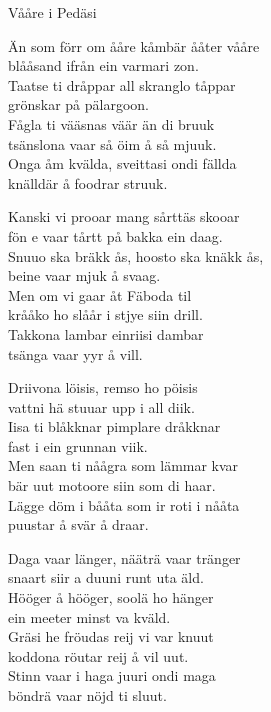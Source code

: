 \begin{song}{Vååre i Pedäsi}
	
	
	
	
	Än som förr om ååre kåmbär ååter vååre\\
	blååsand ifrån ein varmari zon.\\
	Taatse ti dråppar all skranglo tåppar\\
	grönskar på pälargoon.\\
	Fågla ti vääsnas väär än di bruuk\\
	tsänslona vaar så öim å så mjuuk.\\
	Onga åm kvälda, sveittasi ondi fällda\\
	knälldär å foodrar struuk.

	Kanski vi prooar mang sårttäs skooar\\
	fön e vaar tårtt på bakka ein daag.\\
	Snuuo ska bräkk ås, hoosto ska knäkk ås,\\
	beine vaar mjuk å svaag.\\
	Men om vi gaar åt Fäboda til\\
	krååko ho slåår i stjye siin drill.\\
	Takkona lambar einriisi dambar\\
	tsänga vaar yyr å vill.

	Driivona löisis, remso ho pöisis\\
	vattni hä stuuar upp i all diik.\\
	Iisa ti blåkknar pimplare dråkknar\\
	fast i ein grunnan viik.\\
	Men saan ti nåågra som lämmar kvar\\
	bär uut motoore siin som di haar.\\
	Lägge döm i bååta som ir roti i nååta\\
	puustar å svär å draar.

	Daga vaar länger, nääträ vaar tränger\\
	snaart siir a duuni runt uta äld.\\
	Hööger å hööger, soolä ho hänger\\
	ein meeter minst va kväld.\\
	Gräsi he fröudas reij vi var knuut\\
	koddona röutar reij å vil uut.\\
	Stinn vaar i haga juuri ondi maga\\
	böndrä vaar nöjd ti sluut.

	
\end{song}
